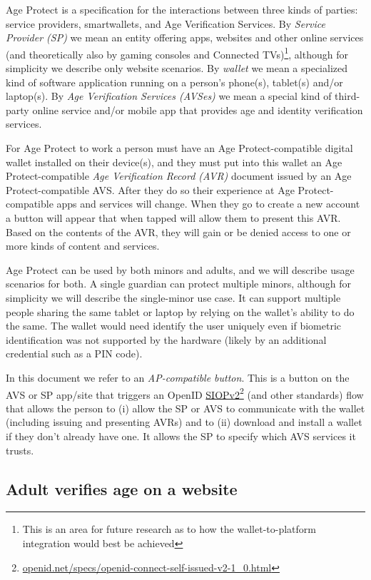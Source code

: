 \documentclass[11pt, oneside]{article}   	%
\newcommand{\hyperfootnote}[1][]{\def\ArgI{{#1}}\hyperfootnoteRelay}
\newcommand\hyperfootnoteRelay[2][]{\href{#1#2}{\ArgI}\footnote{\href{#1#2}{#2}}}
\begin{document}
Age Protect is a specification for the interactions between three kinds of parties: service providers, smartwallets, and Age Verification Services. By \emph{Service Provider (SP)} we mean an entity offering apps, websites and other online services (and theoretically also by gaming consoles and Connected TVs)\footnote{This is an area for future research as to how the wallet-to-platform integration would best be achieved}, although for simplicity we describe only website scenarios. By \emph{wallet} we mean a specialized kind of software application running on a person's phone(s), tablet(s) and/or laptop(s). By \emph{Age Verification Services (AVSes)} we mean a special kind of third-party online service and/or mobile app that provides age and identity verification services. 

For Age Protect to work a person must have an Age Protect-compatible digital wallet installed on their device(s), and they must put into this wallet an Age Protect-compatible \emph{Age Verification Record (AVR)} document issued by an Age Protect-compatible AVS. After they do so their experience at Age Protect-compatible apps and services will change. When they go to create a new account a button will appear that when tapped will allow them to present this AVR. Based on the contents of the AVR, they will gain or be denied access to one or more kinds of content and services. 

Age Protect can be used by both minors and adults, and we will describe usage scenarios for both. A single guardian can protect multiple minors, although for simplicity we will describe the single-minor use case. It can support multiple people sharing the same tablet or laptop by relying on the wallet's ability to do the same. The wallet would need identify the user uniquely even if biometric identification was not supported by the hardware (likely by an additional credential such as a PIN code).

In this document we refer to an \emph{AP-compatible button}. This is a button on the AVS or SP app/site that triggers an OpenID \hyperfootnote[SIOPv2][https://]{openid.net/specs/openid-connect-self-issued-v2-1\_0.html} (and other standards) flow that allows the person to (i) allow the SP or AVS to communicate with the wallet (including issuing and presenting AVRs) and to (ii) download and install a wallet if they don't already have one. It allows the SP to specify which AVS services it trusts.

\subsection{Adult verifies age on a website}
\end{document}
